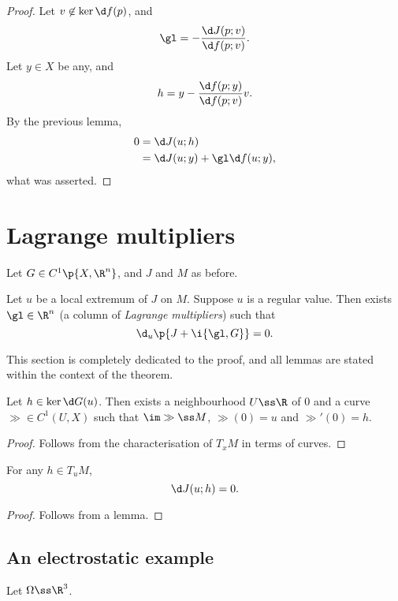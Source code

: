 \begin{proof}
  Let $v \not \in \ker \d f(p)$, and
  $$ \gl = - \frac{\d J(p; v)}{\d f(p; v)}. $$
  Let $y \in X$ be any, and
  $$ h = y - \frac{\d f(p; y)}{\d f(p; v)} v. $$
  By the previous lemma,
  \begin{align*}
    0
    &= \d J(u; h) \\
    &= \d J(u; y) + \gl \d f(u;y),
  \end{align*}
  what was asserted.
\end{proof}

\section{Lagrange multipliers}

Let $G \in C^1\p{X, \R^n}$, and $J$ and $M$ as before.

\begin{theorem}
  Let $u$ be a local extremum of $J$ on $M$.
  Suppose $u$ is a regular value.
  Then exists $\gl \in \R^n$ (a column of \emph{Lagrange multipliers}) such that
  $$ \d_u \p{J + \i{\gl, G}} = 0. $$
\end{theorem}

This section is completely dedicated to the proof, and all lemmas are stated within the context of the theorem.

\begin{lemma}
  Let $h \in \ker \d G(u)$. Then exists a neighbourhood $U \ss \R$ of 0 and a curve $\gg \in C^1(U, X)$ such that $\im \gg \ss M$, $\gg(0) = u$ and $\gg'(0) = h$.
\end{lemma}

\begin{proof}
  Follows from the characterisation of $T_xM$ in terms of curves.
\end{proof}

\begin{lemma}
  For any $h \in T_uM$,
  $$ \d J(u; h) = 0. $$
\end{lemma}

\begin{proof}
  Follows from a lemma.
\end{proof}

\wtf

\subsection{An electrostatic example}

Let $\Omega \ss \R^3$.